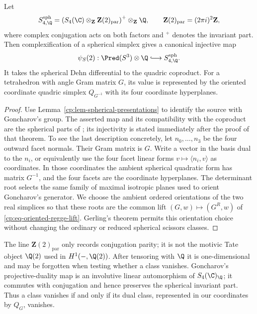 \begin{theorem}
\label{cp:thm-goncharov-spherical}
Let
\[
 S_{4,\Q}^{\mathrm{sph}}
 =\left(
    S_4(\C)\otimes_{\mathbf Z}\mathbf Z(2)_{\mathrm{par}}
   \right)^+\otimes_{\mathbf Z}\Q,
 \qquad
 \mathbf Z(2)_{\mathrm{par}}=(2\pi i)^2\mathbf Z,
\]
where complex conjugation acts on both factors and \({}^+\) denotes the
invariant part.  Then complexification of a spherical simplex gives a
canonical injective map
\begin{equation}
 \psi_S(2):\Pred(S^3)\otimes\Q
 \lhook\joinrel\longrightarrow S_{4,\Q}^{\mathrm{sph}}.
 \label{cp:eq-spherical-quadric-map}
\end{equation}
It takes the spherical Dehn differential to the quadric coproduct.
For a tetrahedron with angle Gram matrix \(G\), its value is represented by
the oriented coordinate quadric simplex \(Q_{G^{-1}}\) with its four
coordinate hyperplanes.
\end{theorem}

\begin{proof}
Use Lemma~\ref{cp:lem-spherical-presentations} to identify the source with
Goncharov's group.  The asserted map and its compatibility with the
coproduct are the spherical parts of
\cite[Theorem~4.14]{Goncharov1999}; its injectivity is stated immediately
after the proof of that theorem.  To see the last
description concretely, let \(n_0,\ldots,n_3\) be the four outward facet
normals.  Their Gram matrix is \(G\).  Write a vector in the basis dual to
the \(n_i\), or equivalently use the four facet linear forms
\(v\mapsto\langle n_i,v\rangle\) as coordinates.  In those coordinates the
ambient spherical quadratic form has matrix \(G^{-1}\), and the four
facets are the coordinate hyperplanes.  The determinant root selects the
same family of maximal isotropic planes used to orient Goncharov's
generator.  We choose the ambient ordered orientations of the two real
simplices so that these roots are the common lift
\((G,w)\mapsto(G^R,w)\) of
\eqref{cp:eq-oriented-regge-lift}.  Gerling's theorem permits this
orientation choice without changing the ordinary or reduced spherical
scissors classes.
\end{proof}

The line \(\mathbf Z(2)_{\mathrm{par}}\) only records conjugation parity; it
is not the motivic Tate object \(\Q(2)\) used in
\(H^1(-,\Q(2))\).  After tensoring with \(\Q\) it is one-dimensional and
may be forgotten when testing whether a class vanishes.  Goncharov's
projective-duality map is an involutive linear automorphism of
\(S_4(\C)_\Q\); it commutes with conjugation and hence preserves the
spherical invariant part.  Thus a class vanishes if and only if its dual class,
represented in our coordinates by \(Q_G\), vanishes.

